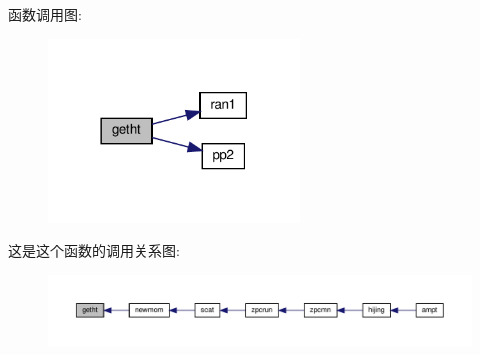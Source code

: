 函数调用图\+:
\nopagebreak
\begin{figure}[H]
\begin{center}
\leavevmode
\includegraphics[width=189pt]{getht_8f90_aacbc4237ed2a07ef381dd960cbd85224_cgraph}
\end{center}
\end{figure}
这是这个函数的调用关系图\+:
\nopagebreak
\begin{figure}[H]
\begin{center}
\leavevmode
\includegraphics[width=350pt]{getht_8f90_aacbc4237ed2a07ef381dd960cbd85224_icgraph}
\end{center}
\end{figure}

